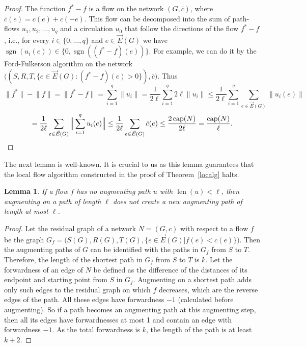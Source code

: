 \documentclass[12pt,a4paper]{article}
\newtheorem{Lemma}[Theorem]{Lemma}
\newcommand{\sgn}{\operatorname{sgn}}
\newcommand{\len}{\operatorname{len}}
\newcommand{\capp}{\operatorname{cap}}
\newcommand{\EG}{\vec{E}(G)}
\renewcommand{\:}{\colon}
\begin{document}
\begin{proof}
The function $f^* - f$ is a flow on the network $(G, \bar{c})$, where $\bar{c}(e) = c(e) + c(-e)$. 
This flow can be decomposed into the sum of path-flows $u_1, u_2, \ldots, u_q$ and a circulation $u_0$ that follow the directions of the flow $f^* - f$, i.e., for every $i \in \{0, \ldots, q\}$ and $e \in \EG$ we have $\sgn(u_i(e)) \in \{0, \sgn((f^*-f)(e))\}$. 
For example, we can do it by the Ford-Fulkerson algorithm \cite{FoFu} on the network $\big((S, R, T, \{e \in \EG \: (f^*-f)(e) > 0\}), \bar{c}\big)$. 
Thus
\begin{equation*}
\big\|f^*\big\| - \big\|f\big\| = \big\|f^* - f\big\| = \sum_{i=1}^q \big\|u_i\big\| = \frac{1}{2\ell} \sum_{i=1}^q 2\ell \big\|u_i\big\| \le \frac{1}{2\ell} \sum_{i=1}^q \sum_{e \in \EG} \big\|u_i(e)\big\|
\end{equation*}
\begin{equation*}
= \frac{1}{2\ell} \sum_{e \in \EG} \Big\|\sum_{i=1}^q u_i(e)\Big\| \le \frac{1}{2\ell} \sum_{e \in \EG} \bar{c}(e) \le \frac{2\capp(N)}{2\ell} = \frac{\capp(N)}{\ell}. \qedhere
\end{equation*}
\end{proof}

The next lemma is well-known. 
It is crucial to us as this lemma guarantees that the local flow algorithm constructed in the proof of Theorem~\ref{localg} halts. 

\begin{Lemma}\label{lem:nonewshort}
If a flow $f$ has no augmenting path $u$ with $\len(u)<\ell$, then augmenting on a path of length $\ell$ does not create a new augmenting path of length at most $\ell$.
\end{Lemma}

\begin{proof}
Let the residual graph of a network $N = (G, c)$ with respect to a flow $f$ be the graph $G_f = \Big(S(G), R(G), T(G), \big\{e \in \EG \big| f(e) < c(e) \big\}\Big)$. 
Then the augmenting paths of $G$ can be identified with the paths in $G_f$ from $S$ to $T$. 
Therefore, the length of the shortest path in $G_f$ from $S$ to $T$ is $k$. 
Let the forwardness of an edge of $N$ be defined as the difference of the distances of its endpoint and starting point from $S$ in $G_f$. 
Augmenting on a shortest path adds only such edges to the residual graph on which $f$ decreases, which are the reverse edges of the path. 
All these edges have forwardness $-1$ (calculated before augmenting). 
So if a path becomes an augmenting path at this augmenting step, then all its edges have forwardnesses at most 1 and contain an edge with forwardness $-1$. 
As the total forwardness is $k$, the length of the path is at least $k + 2$. 
\end{proof}
\end{document}
